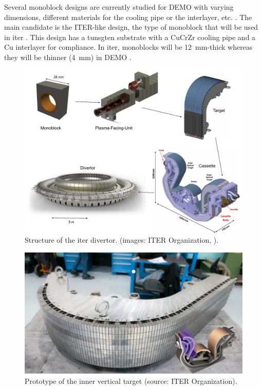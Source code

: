 Several \gls{monoblock} designs are currently studied for DEMO with varying dimensions, different materials for the cooling pipe or the interlayer, etc. .
The main candidate is the ITER-like design, the type of \gls{monoblock} that will be used in \acrshort{iter} \cite{hirai_use_2016}.
This design has a tunsgten substrate with a CuCrZr cooling pipe and a Cu interlayer for compliance.
In \acrshort{iter}, \glspl{monoblock} will be \SI{12}{mm}-thick whereas they will be thinner (\SI{4}{mm}) in DEMO .

\begin{figure}
    \includegraphics[width=\linewidth]{Figures/Chapter1/monoblock_to_divertor.pdf}
    \caption{Structure of the \acrshort{iter} divertor. (images: ITER Organization, \cite{guerrini_fabrication_2021}).}
\end{figure}

\begin{figure} [h]
    \centering
    \includegraphics[width=0.8\linewidth]{Figures/Chapter1/inner_target_iter.jpg}
    \caption{Prototype of the inner vertical target (source: ITER Organization).}
\end{figure}

